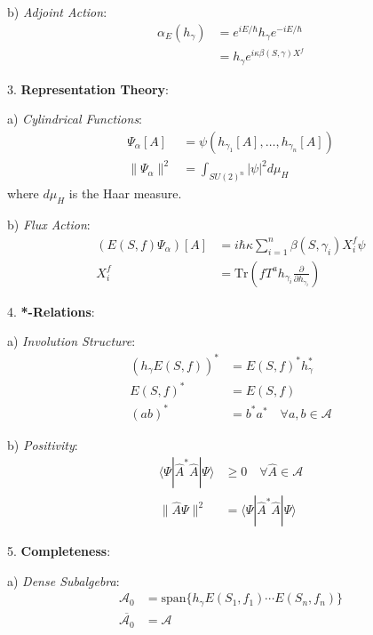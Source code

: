 \documentclass[12pt,a4paper]{article}
\begin{document}
   b) \textit{Adjoint Action}:
      \[
      \begin{aligned}
      \alpha_E(h_\gamma) &= e^{iE/\hbar}h_\gamma e^{-iE/\hbar} \\
      &= h_\gamma e^{i\kappa\beta(S,\gamma)X^f}
      \end{aligned}
      \]

3. \textbf{Representation Theory}:
   
   a) \textit{Cylindrical Functions}:
      \[
      \begin{aligned}
      \Psi_\alpha[A] &= \psi(h_{\gamma_1}[A],\ldots,h_{\gamma_n}[A]) \\
      \|\Psi_\alpha\|^2 &= \int_{SU(2)^n} |\psi|^2 d\mu_H
      \end{aligned}
      \]
      where $d\mu_H$ is the Haar measure.
   
   b) \textit{Flux Action}:
      \[
      \begin{aligned}
      (E(S,f)\Psi_\alpha)[A] &= i\hbar\kappa\sum_{i=1}^n \beta(S,\gamma_i)X^f_i\psi \\
      X^f_i &= \text{Tr}(fT^ah_{\gamma_i}\frac{\partial}{\partial h_{\gamma_i}})
      \end{aligned}
      \]

4. \textbf{*-Relations}:
   
   a) \textit{Involution Structure}:
      \[
      \begin{aligned}
      (h_\gamma E(S,f))^* &= E(S,f)^* h_\gamma^* \\
      E(S,f)^* &= E(S,f) \\
      (ab)^* &= b^*a^* \quad \forall a,b \in \mathcal{A}
      \end{aligned}
      \]
   
   b) \textit{Positivity}:
      \[
      \begin{aligned}
      \langle\Psi|\hat{A}^*\hat{A}|\Psi\rangle &\geq 0 \quad \forall \hat{A} \in \mathcal{A} \\
      \|\hat{A}\Psi\|^2 &= \langle\Psi|\hat{A}^*\hat{A}|\Psi\rangle
      \end{aligned}
      \]

5. \textbf{Completeness}:
   
   a) \textit{Dense Subalgebra}:
      \[
      \begin{aligned}
      \mathcal{A}_0 &= \text{span}\{h_\gamma E(S_1,f_1)\cdots E(S_n,f_n)\} \\
      \overline{\mathcal{A}_0} &= \mathcal{A}
      \end{aligned}
      \]
   
\end{document}
